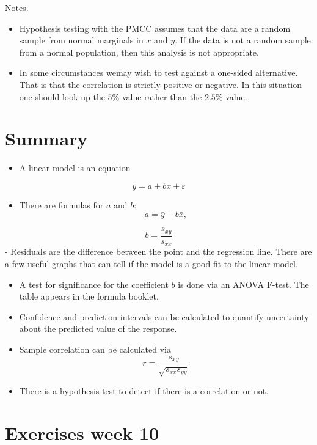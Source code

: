 \documentclass[
]{book}
\providecommand{\tightlist}{%
  \setlength{\itemsep}{0pt}\setlength{\parskip}{0pt}}
\theoremstyle{definition}
\theoremstyle{definition}
\theoremstyle{definition}
\theoremstyle{definition}
\theoremstyle{remark}
\begin{document}
Notes.

\begin{itemize}
\item
  Hypothesis testing with the PMCC assumes that the data are a random sample from normal marginals in \(x\) and \(y\). If the data is not a random sample from a normal population, then this analysis is not appropriate.
\item
  In some circumstances wemay wish to test against a one-sided alternative. That is that the correlation is strictly positive or negative. In this situation one should look up the \(5\%\) value rather than the \(2.5\%\) value.
\end{itemize}

\hypertarget{summary-3}{%
\section{Summary}\label{summary-3}}

\begin{itemize}
\tightlist
\item
  A linear model is an equation
\end{itemize}

\[y = a+bx +\varepsilon\]

\begin{itemize}
\tightlist
\item
  There are formulas for \(a\) and \(b\):
  \[a = \bar{y}-b\bar{x},\]
\end{itemize}

\[b = \frac{s_{xy}}{s_{xx}}\]
- Residuals are the difference between the point and the regression line. There are a few useful graphs that can tell if the model is a good fit to the linear model.

\begin{itemize}
\item
  A test for significance for the coefficient \(b\) is done via an ANOVA F-test. The table appears in the formula booklet.
\item
  Confidence and prediction intervals can be calculated to quantify uncertainty about the predicted value of the response.
\item
  Sample correlation can be calculated via
  \[r = \frac{s_{xy}}{\sqrt{s_{xx}s_{yy}}}\]
\item
  There is a hypothesis test to detect if there is a correlation or not.
\end{itemize}

\hypertarget{exercises-week-10}{%
\section{Exercises week 10}\label{exercises-week-10}}
\end{document}
